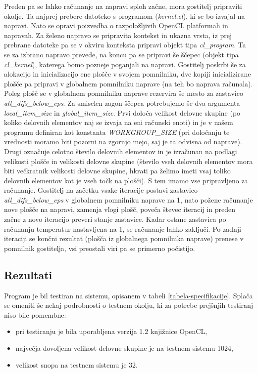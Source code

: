 \documentclass[a4paper,titlepage,11pt]{article}
\begin{document}
Preden pa se lahko računanje na napravi sploh začne, mora gostitelj pripraviti okolje. Ta najprej prebere datoteko s programom (\textit{kernel.cl}), ki se bo izvajal na napravi. Nato se opravi poizvedba o razpoložljivih OpenCL platformah in napravah. Za želeno napravo se pripravita kontekst in ukazna vrsta, iz prej prebrane datoteke pa se v okviru konteksta pripravi objekt tipa \textit{cl\_program}. Ta se za izbrano napravo prevede, na koncu pa se pripravi še ščepec (objekt tipa \textit{cl\_kernel}), katerega bomo pozneje poganjali na napravi. Gostitelj poskrbi še za alokacijo in inicializacijo ene plošče v svojem pomnilniku, dve kopiji inicializirane plošče pa pripravi v globalnem pomnilniku naprave (na teh bo naprava računala). Poleg plošč se v globalnem pomnilniku naprave rezervira še mesto za zastavico \textit{all\_difs\_below\_eps}. Za smiselen zagon ščepca potrebujemo še dva argumenta - \textit{local\_item\_size} in \textit{global\_item\_size}. Prvi določa velikost delovne skupine (po koliko delovnih elementov naj se izvaja na eni računski enoti) in je v našem programu definiran kot konstanta \textit{WORKGROUP\_SIZE} (pri določanju te vrednosti moramo biti pozorni na zgornjo mejo, saj je ta odvisna od naprave). Drugi označuje celotno število delovnih elementov in je izračunan na podlagi velikosti plošče in velikosti delovne skupine (število vseh delovnih elementov mora biti večkratnik velikosti delovne skupine, hkrati pa želimo imeti vsaj toliko delovnih elementov kot je vseh točk na plošči). S tem imamo vse pripravljeno za računanje. Gostitelj na začetku vsake iteracije postavi zastavico \textit{all\_difs\_below\_eps} v globalnem pomnilniku naprave na 1, nato požene računanje nove plošče na napravi, zamenja vlogi plošč, poveča števec iteracij in preden začne z novo iteracijo preveri stanje zastavice. Kadar ostane zastavica po računanju temperatur nastavljena na 1, se računanje lahko zaključi. Po zadnji iteraciji se končni rezultat (plošča iz globalnega pomnilnika naprave) prenese v pomnilnik gostitelja, vsi preostali viri pa se primerno počistijo.

\subsection{Rezultati}

Program je bil testiran na sistemu, opisanem v tabeli \ref{tabela-specifikacije}. Splača se omeniti še nekaj podrobnosti o testnem okolju, ki za potrebe prejšnjih testiranj niso bile pomembne:
\begin{itemize}
\item pri testiranju je bila uporabljena verzija 1.2 knjižnice OpenCL,
\item največja dovoljena velikost delovne skupine je na testnem sistemu 1024,
\item velikost snopa na testnem sistemu je 32.
\end{itemize}
\end{document}
